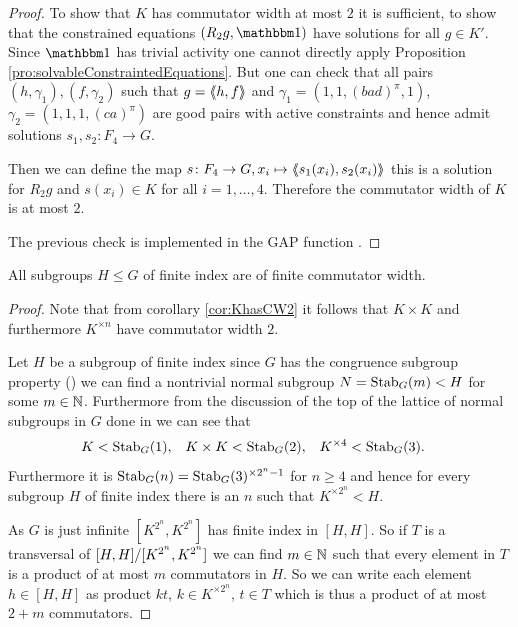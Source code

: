 \documentclass[a4paper,11pt]{amsart}
\begin{document}
\begin{proof}
 To show that $K$ has commutator width at most $2$ it is sufficient, to show that 
 the constrained equations $(R_2g,\id)$ have solutions for all $g\in K'$. 
 Since $\id$ has trivial activity one cannot directly apply 
 Proposition \ref{pro:solvableConstraintedEquations}.  But one can check that all 
 pairs $(h,\gamma_1),(f,\gamma_2)$ such that $g=\langle\negthickspace\langle h,f\rangle\negthickspace\rangle$ and
 $\gamma_1=(1,1,(bad)^\pi,1)$, $\gamma_2=(1,1,1,(ca)^\pi)$ are good pairs with active
 constraints and hence admit solutions $s_1,s_2\colon F_4\to G$.
 
 Then we can define the map $s\colon F_4\to G, x_i\mapsto \langle\negthickspace\langle s_1(x_i),s_2(x_i)\rangle\negthickspace\rangle$ this is a solution
 for $R_2g$ and $s(x_i)\in K$ for all $i=1,\ldots,4$. Therefore the commutator width of $K$ is at most $2$.
 
 The previous check is implemented in the GAP function . 
\end{proof}
\begin{cor}
  All subgroups $H \leq G$ of finite index are of finite commutator width.
\end{cor}

\begin{proof}
 Note that from corollary \ref{cor:KhasCW2} it follows that $K\times K$ and furthermore 
 $K^{\times n}$ have commutator width $2$. 
 
 Let $H$ be a subgroup of finite index since $G$ has the congruence subgroup property
 (\cite{Bartholdi:parabolicSubgroups}) we can find a nontrivial normal subgroup $N=\textup{Stab}_G(m)<H$
 for some $m\in\mathbb{N}$. Furthermore from the discussion of the top of the lattice of normal subgroups
 in $G$ done in \cite{Bartholdi:parabolicSubgroups} we can see that 
 \begin{align*}
  K&<\textup{Stab}_G(1), & K\times K&<\textup{Stab}_G(2), & K^{\times 4}&<\textup{Stab}_G(3).
 \end{align*}
 Furthermore it is $\textup{Stab}_G(n)=\textup{Stab}_G(3)^{\times 2^n-1}$ for $n\geq 4$ and hence for every 
 subgroup $H$ of finite index there is an $n$ such that $K^{\times 2^n}<H$.
  
  As $G$ is just infinite $[K^{2^n},K^{2^n}]$ has finite index in $[H,H]$.
  So if $T$ is a transversal of ${[H,H]/[K^{2^n},K^{2^n}]}$ we can find 
  $m\in \mathbb{N}$ such that every element in $T$ is a product of at most $m$ commutators in $H$.
  So we can write each element $h\in [H,H]$ as product $kt$, $k\in K^{\times 2^n}$, 
  $t\in T$ which is thus a product of at most $2+m$ commutators.  
\end{proof}
\end{document}
